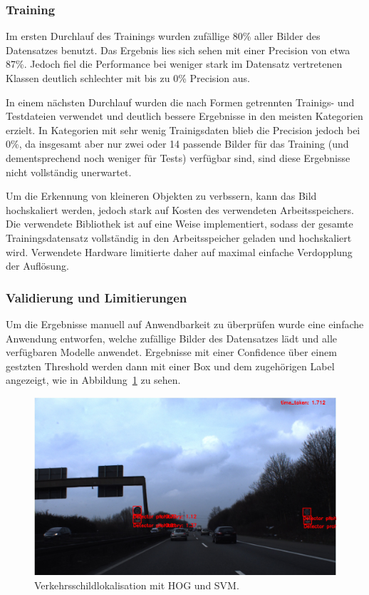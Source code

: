 \documentclass[runningheads]{llncs}
\begin{document}
\subsubsection{Training}
Im ersten Durchlauf des Trainings wurden zufällige 80\% aller Bilder des Datensatzes benutzt. Das Ergebnis lies sich sehen mit einer Precision von etwa 87\%. Jedoch fiel die Performance bei weniger stark im Datensatz vertretenen Klassen deutlich schlechter mit bis zu 0\% Precision aus.

In einem nächsten Durchlauf wurden die nach Formen getrennten Trainigs- und Testdateien verwendet und deutlich bessere Ergebnisse in den meisten Kategorien erzielt. In Kategorien mit sehr wenig Trainigsdaten blieb die Precision jedoch bei 0\%, da insgesamt aber nur zwei oder 14 passende Bilder für das Training (und dementsprechend noch weniger für Tests) verfügbar sind, sind diese Ergebnisse nicht vollständig unerwartet.

Um die Erkennung von kleineren Objekten zu verbssern, kann das Bild hochskaliert werden, jedoch stark auf Kosten des verwendeten Arbeitsspeichers. Die verwendete Bibliothek ist auf eine Weise implementiert, sodass der gesamte Trainingsdatensatz vollständig in den Arbeitsspeicher geladen und hochskaliert wird. Verwendete Hardware limitierte daher auf maximal einfache Verdopplung der Auflösung.

\subsubsection{Validierung und Limitierungen}
Um die Ergebnisse manuell auf Anwendbarkeit zu überprüfen wurde eine einfache Anwendung entworfen, welche zufällige Bilder des Datensatzes lädt und alle verfügbaren Modelle anwendet. Ergebnisse mit einer Confidence über einem gestzten Threshold werden dann mit einer Box und dem zugehörigen Label angezeigt, wie in Abbildung~\ref{fig2} zu sehen.

\begin{figure}[H]
    \centering
    \includegraphics[width=1\textwidth]{images/example_prediction.png}
    \caption{Verkehrsschildlokalisation mit HOG und SVM.}
    \label{fig2}
\end{figure}
\end{document}
